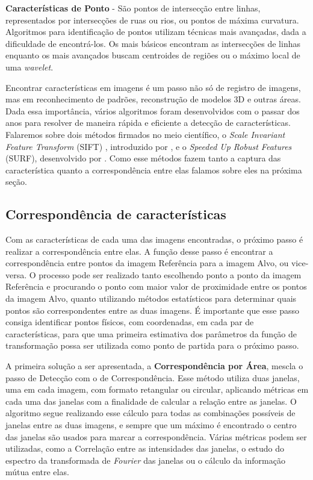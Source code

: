 \textbf{Características de Ponto} - São pontos de intersecção entre linhas, representados por intersecções de ruas ou
rios, ou pontos de máxima curvatura. Algoritmos para identificação de pontos utilizam técnicas mais avançadas, dada a 
dificuldade de encontrá-los. Os mais básicos encontram as intersecções de linhas enquanto os mais avançados buscam
centroides de regiões ou o máximo local de uma \textit{wavelet}.

  Encontrar características em imagens é um passo não só de registro de imagens, mas em reconhecimento de padrões, 
reconstrução de modelos 3D e outras áreas. Dada essa importância, vários algoritmos foram desenvolvidos com o passar dos
anos para resolver de maneira rápida e eficiente a detecção de características. Falaremos sobre dois métodos firmados 
no meio científico, o \textit{Scale Invariant Feature Transform} (SIFT) , introduzido por \cite{lowe2004distinctive}, e 
o \textit{Speeded Up Robust Features} (SURF), desenvolvido por \cite{bay2006surf}. Como esse métodos fazem tanto a 
captura das característica quanto a correspondência entre elas falamos sobre eles na próxima seção.

\subsection{Correspondência de características}

    Com as características de cada uma das imagens encontradas, o próximo passo é realizar a correspondência entre elas.
A função desse passo é encontrar a correspondência entre pontos da imagem Referência para a imagem Alvo, ou vice-versa. 
O processo pode ser realizado tanto escolhendo ponto a ponto da imagem Referência e procurando o ponto com maior valor 
de proximidade entre os pontos da imagem Alvo, quanto utilizando métodos estatísticos para determinar quais pontos são 
correspondentes entre as duas imagens. É importante que esse passo consiga identificar pontos físicos, com coordenadas, 
em cada par de características, para que uma primeira estimativa dos parâmetros da função de transformação possa ser 
utilizada como ponto de partida para o próximo passo.

    A primeira solução a ser apresentada, a \textbf{Correspondência por Área}, mescla o passo de Detecção com o de 
Correspondência. Esse método utiliza duas janelas, uma em cada imagem, com formato retangular ou circular, aplicando
métricas em cada uma das janelas com a finalidade de calcular a relação entre as janelas. O algoritmo segue realizando
esse cálculo para todas as combinações possíveis de janelas entre as duas imagens, e sempre que um máximo é encontrado
o centro das janelas são usados para marcar a correspondência. Várias métricas podem ser utilizadas, como a 
Correlação entre as intensidades das janelas, o estudo do espectro da transformada de \textit{Fourier} das janelas ou 
o cálculo da informação mútua entre elas.

